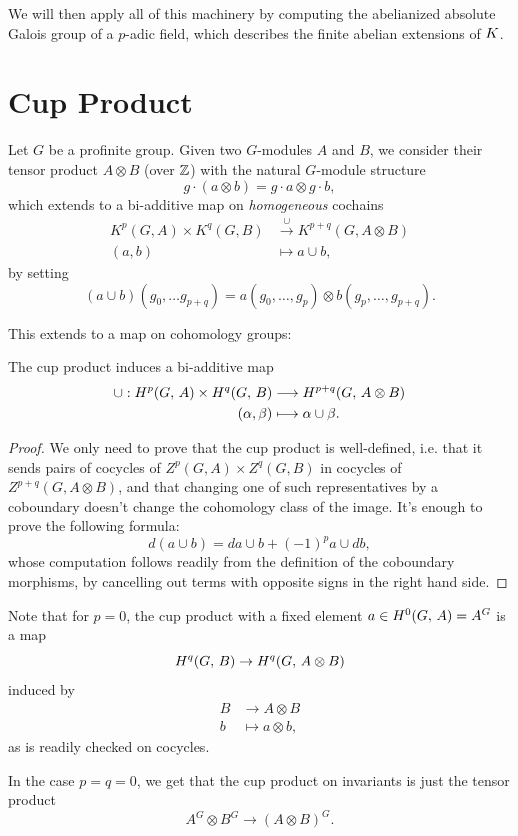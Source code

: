 \documentclass[a4paper, oneside]{memoir}
\begin{document}
We will then apply all of this machinery by computing the abelianized absolute Galois group of a $p$-adic field, which describes the finite abelian extensions of $K$.

\section{Cup Product}

Let $G$ be a profinite group. Given two $G$-modules $A$ and $B$, we consider their tensor product $A\otimes B$ (over $\mathbb{Z}$) with the natural $G$-module structure
\[
    g\cdot (a\otimes b)=g\cdot a\otimes g\cdot b,
\]
which extends to a bi-additive map on \textit{homogeneous} cochains
\begin{align*}
    K^p(G,A)\times K^q(G,B) & \overset{\cup}{\longrightarrow} K^{p+q}(G,A\otimes B) \\
    (a,b)                   & \mapsto a\cup b,
\end{align*}
by setting
\[
    (a\cup b)(g_0,\dots g_{p+q})=a(g_0,\dots,g_p)\otimes b(g_p,\dots,g_{p+q}).
\]

This extends to a map on cohomology groups:

\begin{theorem}\label{thm:Cup}
    The cup product induces a bi-additive map
    \begin{align*}
        \cup: H^{p}( G, \, A )\times H^{q}( G, \, B ) & \longrightarrow H^{p+q}( G, \, A\otimes B ) \\
        (\alpha,\beta)                     & \longmapsto \alpha\cup\beta.
    \end{align*}
\end{theorem}

\begin{proof}
    We only need to prove that the cup product is well-defined, i.e. that it sends pairs of cocycles of $Z^p(G,A)\times Z^q(G,B)$ in cocycles of $Z^{p+q}(G,A\otimes B)$, and that changing one of such representatives by a coboundary doesn't change the cohomology class of the image.
    It's enough to prove the following formula:
    \begin{equation}\label{eq:DiffCup}
        d(a\cup b)=da\cup b+(-1)^pa\cup d b,
    \end{equation}
    whose computation follows readily from the definition of the coboundary morphisms, by cancelling out terms with opposite signs in the right hand side.
\end{proof}

\begin{remark}\label{rm:Cup0n}
    Note that for $p=0$, the cup product with a fixed element $a\in H^{0}( G, \, A )=A^G$ is a map
    \[
        H^{q}( G, \, B )\to H^{q}( G, \, A\otimes B )
    \]
    induced by
    \begin{align*}
        B & \longrightarrow A\otimes B \\
        b & \longmapsto a\otimes b,
    \end{align*}
    as is readily checked on cocycles.

    In the case $p=q=0$, we get that the cup product on invariants is just the tensor product $$A^G\otimes B^G\to (A\otimes B)^G.$$
\end{remark}
\end{document}
